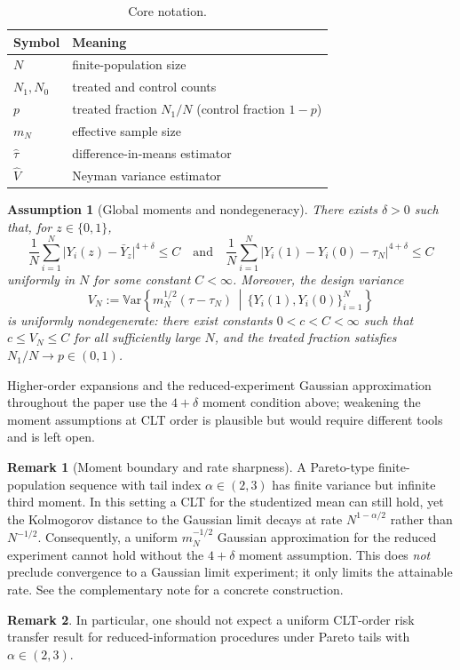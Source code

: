 \documentclass[aos]{imsart}
\newtheorem{assumption}{Assumption}
\theoremstyle{definition}
\newtheorem{remark}{Remark}
\theoremstyle{plain}
\newcommand{\Var}{\mathbb{V}\mathrm{ar}}
\newcommand{\mN}{m_N}
\begin{document}
\begin{table}[t]
\centering
\small
\begin{tabular}{ll}
\toprule
Symbol & Meaning \\
\midrule
$N$ & finite-population size \\
$N_1,N_0$ & treated and control counts \\
$p$ & treated fraction $N_1/N$ (control fraction $1-p$) \\
$\mN$ & effective sample size \\
$\hat\tau$ & difference-in-means estimator \\
$\hat V$ & Neyman variance estimator \\
\bottomrule
\end{tabular}
\caption{Core notation.}
\label{tab:notation}
\end{table}


\begin{assumption}[Global moments and nondegeneracy]\label{ass:global_moments}
There exists $\delta>0$ such that, for $z\in\{0,1\}$,
\[
\frac{1}{N}\sum_{i=1}^N \bigl|Y_i(z)-\bar Y_z\bigr|^{4+\delta} \le C
\quad\text{and}\quad
\frac{1}{N}\sum_{i=1}^N \bigl|Y_i(1)-Y_i(0)-\tau_N\bigr|^{4+\delta} \le C
\]
uniformly in $N$ for some constant $C<\infty$.
Moreover, the design variance
\[
V_N:=\Var\!\left\{m_N^{1/2}(\hat\tau-\tau_N)\,\middle|\,\{Y_i(1),Y_i(0)\}_{i=1}^N\right\}
\]
is uniformly nondegenerate: there exist constants $0<c<C<\infty$ such that $c\le V_N\le C$ for all sufficiently large $N$, and the treated fraction satisfies $N_1/N\to p\in(0,1)$.
\end{assumption}
Higher-order expansions and the reduced-experiment Gaussian approximation throughout the paper use the $4+\delta$ moment condition above; weakening the moment assumptions at CLT order is plausible but would require different tools and is left open.
\begin{remark}[Moment boundary and rate sharpness]\label{rem:pareto_boundary}
A Pareto-type finite-population sequence with tail index $\alpha\in(2,3)$ has finite variance but infinite third moment. In this setting a CLT for the studentized mean can still hold, yet the Kolmogorov distance to the Gaussian limit decays at rate $N^{1-\alpha/2}$ rather than $N^{-1/2}$. Consequently, a uniform $m_N^{-1/2}$ Gaussian approximation for the reduced experiment cannot hold without the $4+\delta$ moment assumption. This does \emph{not} preclude convergence to a Gaussian limit experiment; it only limits the attainable rate. See the complementary note for a concrete construction.
\end{remark}
\begin{remark}\label{rem:pareto_boundary_tv}
In particular, one should not expect a uniform CLT-order risk transfer result for reduced-information procedures under Pareto tails with $\alpha\in(2,3)$.
\end{remark}
\end{document}
